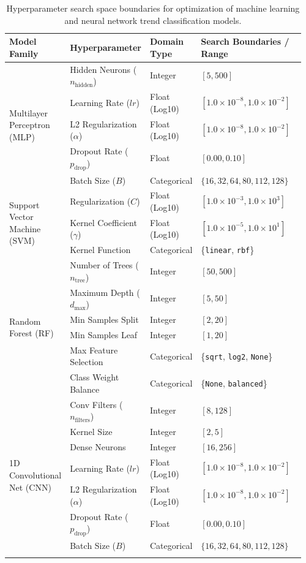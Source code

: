 \ifdefined\methodresultscompact\else
\begin{table}[htbp]
\caption{Hyperparameter search space boundaries for optimization of machine learning and neural network trend classification models.}
\label{tab:search_space}
\centering
\small
\setlength{\tabcolsep}{3pt}
\begin{tabularx}{\textwidth}{@{}p{0.20\linewidth} p{0.24\linewidth} p{0.14\linewidth} p{0.38\linewidth}@{}}
\toprule
Model Family & Hyperparameter & Domain Type & Search Boundaries / Range \\
\midrule
\multirow{5}{*}{Multilayer Perceptron (MLP)} 
  & Hidden Neurons ($n_{\text{hidden}}$) & Integer & $[5, 500]$ \\
  & Learning Rate ($lr$) & Float (Log10) & $[1.0 \times 10^{-8}, 1.0 \times 10^{-2}]$ \\
  & L2 Regularization ($\alpha$) & Float (Log10) & $[1.0 \times 10^{-8}, 1.0 \times 10^{-2}]$ \\
  & Dropout Rate ($p_{\text{drop}}$) & Float & $[0.00, 0.10]$ \\
  & Batch Size ($B$) & Categorical & $\{16, 32, 64, 80, 112, 128\}$ \\
\midrule
\multirow{3}{*}{Support Vector Machine (SVM)} 
  & Regularization ($C$) & Float (Log10) & $[1.0 \times 10^{-3}, 1.0 \times 10^{3}]$ \\
  & Kernel Coefficient ($\gamma$) & Float (Log10) & $[1.0 \times 10^{-5}, 1.0 \times 10^{1}]$ \\
  & Kernel Function & Categorical & \{\texttt{linear}, \texttt{rbf}\} \\
\midrule
\multirow{6}{*}{Random Forest (RF)} 
  & Number of Trees ($n_{\text{tree}}$) & Integer & $[50, 500]$ \\
  & Maximum Depth ($d_{\text{max}}$) & Integer & $[5, 50]$ \\
  & Min Samples Split & Integer & $[2, 20]$ \\
  & Min Samples Leaf & Integer & $[1, 20]$ \\
  & Max Feature Selection & Categorical & \{\texttt{sqrt}, \texttt{log2}, \texttt{None}\} \\
  & Class Weight Balance & Categorical & \{\texttt{None}, \texttt{balanced}\} \\
\midrule
\multirow{7}{*}{1D Convolutional Net (CNN)} 
  & Conv Filters ($n_{\text{filters}}$) & Integer & $[8, 128]$ \\
  & Kernel Size & Integer & $[2, 5]$ \\
  & Dense Neurons & Integer & $[16, 256]$ \\
  & Learning Rate ($lr$) & Float (Log10) & $[1.0 \times 10^{-8}, 1.0 \times 10^{-2}]$ \\
  & L2 Regularization ($\alpha$) & Float (Log10) & $[1.0 \times 10^{-8}, 1.0 \times 10^{-2}]$ \\
  & Dropout Rate ($p_{\text{drop}}$) & Float & $[0.00, 0.10]$ \\
  & Batch Size ($B$) & Categorical & $\{16, 32, 64, 80, 112, 128\}$ \\
\botrule
\end{tabularx}
\end{table}
\fi

